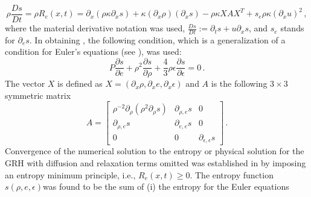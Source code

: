 \documentclass[times,doublespace]{fldauth}%
\begin{document}
\begin{equation} \label{eq:app_entr_eq_non_equil}
\rho \frac{Ds}{Dt} = \rho R_e(x,t) = \partial_x \left( \rho \kappa \partial_x s \right) + \kappa \left(\partial_x \rho\right) \left( \partial_x s\right) - \rho \kappa X A X^T  + s_e \rho \kappa (\partial_x u)^2 \, ,
\end{equation} 
% 
where the material derivative notation was used, $\frac{Ds}{Dt} := \partial_t s + u \partial_x s$, and
$s_e$ stands for $\partial_e s$. 
In obtaining , the following condition, which is a generalization of a condition
for Euler's equations (see \cite{our_jcp_radhy_paper}), was used:
%
\begin{equation} 
\label{eq:visc_reg_assumptions}
P \frac{\partial s}{\partial e} + \rho^2 \frac{\partial s}{\partial \rho} + \frac{4}{3} \rho \epsilon \frac{\partial s}{\partial \epsilon} = 0 \,. 
\end{equation}
%
The vector $X$ is defined as $X=\left( \partial_x \rho, \partial_x e, \partial_x \epsilon \right)$ and $A$ is the 
following $3 \times 3$ symmetric matrix
%
 \begin{equation}\label{eq:mat-quad-form}
 A = 
\begin{bmatrix}
\rho^{-2}\partial_{\rho} \left( \rho^2 \partial_{\rho} s \right) & \partial_{\rho,e} s & 0 \\
 \partial_{\rho,e} s & \partial_{e,e} s & 0 \\
0 & 0 & \partial_{\epsilon,\epsilon} s
\end{bmatrix}
\,.
\end{equation}
%
Convergence of the numerical solution to the entropy or physical solution for the GRH with diffusion and relaxation terms omitted was established in \cite{our_jcp_radhy_paper} by imposing an entropy minimum principle, i.e., $R_e(x,t) \geq 0$. The entropy function $s(\rho,e,\epsilon)$was found to be the sum of (i) the entropy for the Euler equations 
\end{document}
